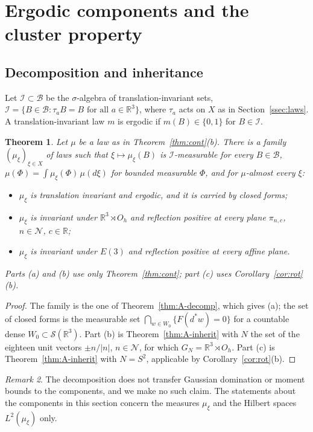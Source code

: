 \documentclass[11pt]{amsart}
\theoremstyle{plain}
\newtheorem{theorem}{Theorem}[section]
\theoremstyle{definition}
\theoremstyle{remark}
\newtheorem{remark}[theorem]{Remark}
\numberwithin{equation}{section}
\newcommand{\R}{\mathbb{R}}
\newcommand{\cB}{\mathcal{B}}
\newcommand{\cI}{\mathcal{I}}
\newcommand{\cN}{\mathcal{N}}
\newcommand{\cS}{\mathcal{S}}
\newcommand{\Oh}{O_h}
\newcommand{\Eu}{E(3)}
\newcommand{\abs}[1]{\lvert #1\rvert}
\begin{document}
\section{Ergodic components and the cluster property}\label{sec:ergodic}

\subsection{Decomposition and inheritance}
Let $\cI\subset\cB$ be the $\sigma$-algebra of translation-invariant sets, $\cI=\{B\in\cB:\tau_aB=B\text{ for all }a\in\R^3\}$, where $\tau_a$ acts on $X$ as in Section~\ref{ssec:laws}. A translation-invariant law $m$ is ergodic if $m(B)\in\{0,1\}$ for $B\in\cI$.

\begin{theorem}\label{thm:components}
Let $\mu$ be a law as in Theorem~\ref{thm:cont}(b). There is a family $(\mu_\xi)_{\xi\in X}$ of laws such that $\xi\mapsto\mu_\xi(B)$ is $\cI$-measurable for every $B\in\cB$, $\mu(\Phi)=\int\mu_\xi(\Phi)\,\mu(d\xi)$ for bounded measurable $\Phi$, and for $\mu$-almost every $\xi$:
\begin{itemize}
\item[(a)] $\mu_\xi$ is translation invariant and ergodic, and it is carried by closed forms;
\item[(b)] $\mu_\xi$ is invariant under $\R^3\rtimes\Oh$ and reflection positive at every plane $\pi_{n,c}$, $n\in\cN$, $c\in\R$;
\item[(c)] $\mu_\xi$ is invariant under $\Eu$ and reflection positive at every affine plane.
\end{itemize}
Parts (a) and (b) use only Theorem~\ref{thm:cont}; part (c) uses Corollary~\ref{cor:rot}(b).
\end{theorem}

\begin{proof}
The family is the one of Theorem~\ref{thm:A-decomp}, which gives (a); the set of closed forms is the measurable set $\bigcap_{w\in W_0}\{F(d^*w)=0\}$ for a countable dense $W_0\subset\cS(\R^3)$. Part (b) is Theorem~\ref{thm:A-inherit} with $N$ the set of the eighteen unit vectors $\pm n/\abs n$, $n\in\cN$, for which $G_N=\R^3\rtimes\Oh$. Part (c) is Theorem~\ref{thm:A-inherit} with $N=S^2$, applicable by Corollary~\ref{cor:rot}(b).
\end{proof}

\begin{remark}\label{rem:components}
The decomposition does not transfer Gaussian domination or moment bounds to the components, and we make no such claim. The statements about the components in this section concern the measures $\mu_\xi$ and the Hilbert spaces $L^2(\mu_\xi)$ only.
\end{remark}
\end{document}
